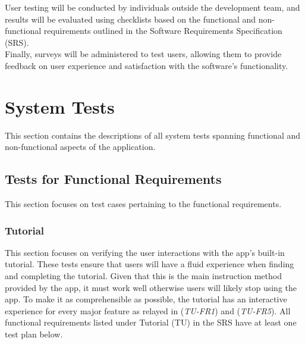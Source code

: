\documentclass[12pt, titlepage]{article}
\begin{document}
User testing will be conducted by individuals outside the development team, and results will be evaluated using checklists based on the functional and non-functional requirements outlined in the Software Requirements Specification (SRS). \\

Finally, surveys will be administered to test users, allowing them to provide feedback on user experience and satisfaction with the software's functionality. \\

\section{System Tests}
This section contains the descriptions of all system tests spanning functional and non-functional aspects of the application.

\subsection{Tests for Functional Requirements}
This section focuses on test cases pertaining to the functional requirements.

\subsubsection{Tutorial}

This section focuses on verifying the user interactions with the app's built-in tutorial. These tests ensure that users will have a fluid experience when finding and completing the tutorial. Given that this is the main instruction method provided by the app, it must work well otherwise users will likely stop using the app. To make it as comprehensible as possible, the tutorial has an interactive experience for every major feature as relayed in (\textit{TU-FR1}) and (\textit{TU-FR5}).  All functional requirements listed under Tutorial (TU) in the SRS \cite{SRS} have at least one test plan below.
\end{document}
